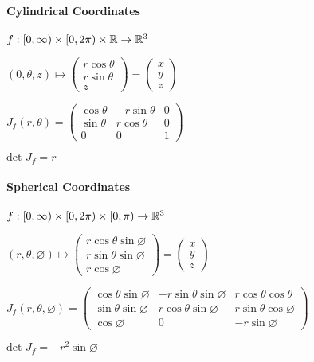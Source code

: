 \paragraph{Cylindrical Coordinates}
\begin{compactitem}
    \item $f: [0, \infty) \times [0, 2 \pi) \times \mathbb{R} \to \mathbb{R}^3$
    \item $(0, \theta, z) \mapsto
        \begin{pmatrix}
            r \cos \theta\\
            r \sin \theta\\
            z
        \end{pmatrix} =
        \begin{pmatrix}
            x\\
            y\\
            z
        \end{pmatrix}$
    \item $J_f(r, \theta) =
        \begin{pmatrix}
            \cos \theta & -r \sin \theta & 0\\
            \sin \theta & r \cos \theta & 0\\
            0 & 0 & 1
        \end{pmatrix}$
    \item $\text{det }J_f = r$
\end{compactitem}

\paragraph{Spherical Coordinates}
\begin{compactitem}
    \item $f: [0, \infty) \times [0, 2 \pi) \times [0, \pi) \to \mathbb{R}^3$
    \item $(r, \theta, \varnothing) \mapsto
        \begin{pmatrix}
            r \cos \theta \sin \varnothing\\
            r \sin \theta \sin \varnothing\\
            r \cos \varnothing
        \end{pmatrix} =
        \begin{pmatrix}
            x\\
            y\\
            z
        \end{pmatrix}$
    \item $J_f(r, \theta, \varnothing) =
        \begin{pmatrix}
            \cos \theta \sin \varnothing & -r \sin \theta \sin \varnothing & r \cos \theta \cos \theta\\
            \sin \theta \sin \varnothing & r \cos \theta \sin \varnothing & r \sin \theta \cos \varnothing\\
            \cos \varnothing & 0 & -r \sin \varnothing
        \end{pmatrix}$
    \item $\text{det } J_f = -r^2 \sin \varnothing$
\end{compactitem}

